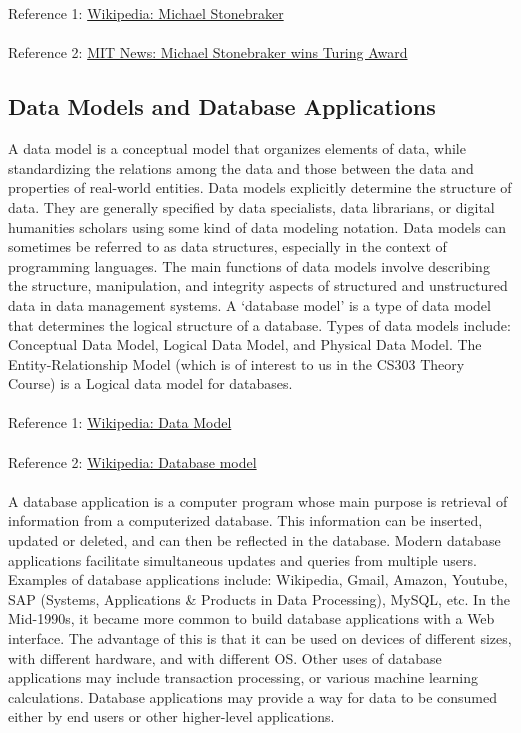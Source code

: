 \documentclass{article}
\begin{document}
\\ \\
Reference 1:
{\color{blue}
\href{https://en.wikipedia.org/wiki/Michael_Stonebraker}
{Wikipedia: Michael Stonebraker}
}
\\ \\ 
Reference 2:
{\color{blue}
\href{https://news.mit.edu/2015/michael-stonebraker-wins-turing-award-0325}
{MIT News: Michael Stonebraker wins Turing Award}
}
\newpage
\subsection{Data Models and Database Applications}
A data model is a conceptual model that organizes elements of data, while standardizing the relations among the data and those between the data and properties of real-world entities. Data models explicitly determine the structure of data. They are generally specified by data specialists, data librarians, or digital humanities scholars using some kind of data modeling notation. Data models can sometimes be referred to as data structures, especially in the context of programming languages. The main functions of data models involve describing the structure, manipulation, and integrity aspects of structured and unstructured data in data management systems. A `database model' is a type of data model that determines the logical structure of a database. Types of data models include: Conceptual Data Model, Logical Data Model, and Physical Data Model. The Entity-Relationship Model (which is of interest to us in the CS303 Theory Course) is a Logical data model for databases.
\\ \\
Reference 1:
{\color{blue}
\href{https://en.wikipedia.org/wiki/Data_model}
{Wikipedia: Data Model}
}
\\ \\ 
Reference 2:
{\color{blue}
\href{https://en.wikipedia.org/wiki/Database_model}
{Wikipedia: Database model}
}
\\ \\
A database application is a computer program whose main purpose is retrieval of information from a computerized database. This information can be inserted, updated or deleted, and can then be reflected in the database. Modern database applications facilitate simultaneous updates and queries from multiple users. Examples of database applications include: Wikipedia, Gmail, Amazon, Youtube, SAP (Systems, Applications \& Products in Data Processing), MySQL, etc. In the Mid-1990s, it became more common to build database applications with a Web interface. The advantage of this is that it can be used on devices of different sizes, with different hardware, and with different OS. Other uses of database applications may include transaction processing, or various machine learning calculations. Database applications may provide a way for data to be consumed either by end users or other higher-level applications.
\end{document}
